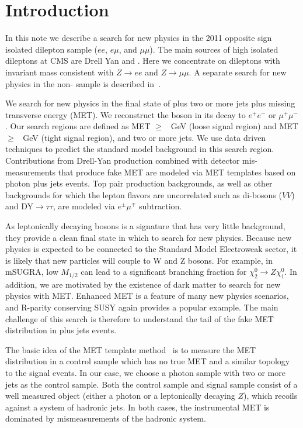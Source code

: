 
\section{Introduction}

In this note we describe a search for new physics in the 2011 
opposite sign isolated dilepton sample ($ee$, $e\mu$, and $\mu\mu$).  
The main sources of high \pt isolated dileptons at CMS are Drell Yan and \ttbar.
Here we concentrate on dileptons with invariant mass consistent
with $Z \to ee$ and $Z \to \mu\mu$.  A separate search for new physics in the non-\Z
sample is described in~\cite{ref:GenericOS}.

We search for new physics in the final state of \Z plus two or more jets plus missing transverse energy (MET). We reconstruct the \Z boson
in its decay to $e^+e^-$ or $\mu^+\mu^-$. Our search regions are defined as MET $\ge$ \signalmetl~GeV (loose signal region) and MET $\ge$ \signalmett~GeV (tight signal region), and two or more jets. We use data driven techniques to predict the
standard model background in this search region. 
Contributions from Drell-Yan production combined with detector mis-measurements that produce fake MET are modeled via MET templates based on photon plus jets events. 
Top pair production backgrounds, as well as other backgrounds for which the lepton
flavors are uncorrelated such as di-bosons ($VV$) and DY$\rightarrow\tau\tau$, are modeled via $e^\pm\mu^\mp$ subtraction.

As leptonically decaying \Z bosons is a signature that has very little background, they provide a clean final state in which to search for new physics. 
Because new physics is expected to be connected to the Standard Model Electroweak sector, it is likely that new particles will couple to W and Z bosons. 
For example, in mSUGRA, low $M_{1/2}$ can lead to a significant branching fraction for $\chi_2^0 \rightarrow Z \chi_1^0$. 
In addition, we are motivated by the existence of dark matter to search for new physics with MET.
Enhanced MET is a feature of many new physics scenarios, and R-parity conserving SUSY again provides a popular example. The main challenge of this search is therefore to 
understand the tail of the fake MET distribution in \Z plus jets events.

The basic idea of the MET template method~\cite{ref:templates1}\cite{ref:templates2} is to measure the MET distribution in a control sample which has no true MET and a similar topology to the signal events. 
In our case, we choose a photon sample with two or more jets as the control sample.
Both the control sample and signal sample consist of a well measured object (either a photon or a leptonically decaying $Z$), which recoils against a system of hadronic jets. 
In both cases, the instrumental MET is dominated by mismeasurements of the hadronic system. 


